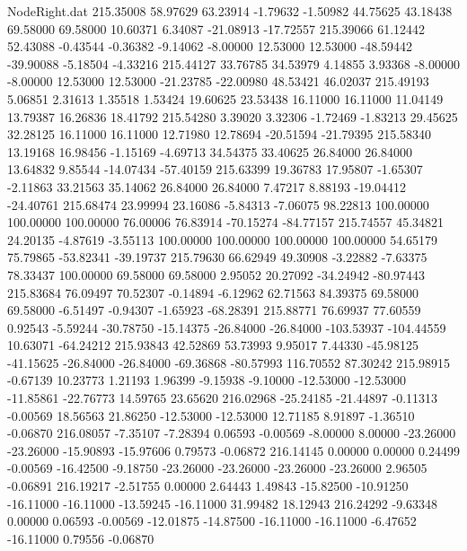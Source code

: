 \begin{filecontents}{NodeRight.dat}
 215.35008   58.97629   63.23914    -1.79632   -1.50982   44.75625   43.18438   69.58000   69.58000   10.60371    6.34087  -21.08913  -17.72557
 215.39066   61.12442   52.43088    -0.43544   -0.36382   -9.14062   -8.00000   12.53000   12.53000  -48.59442  -39.90088   -5.18504   -4.33216
 215.44127   33.76785   34.53979     4.14855    3.93368   -8.00000   -8.00000   12.53000   12.53000  -21.23785  -22.00980   48.53421   46.02037
 215.49193    5.06851    2.31613     1.35518    1.53424   19.60625   23.53438   16.11000   16.11000   11.04149   13.79387   16.26836   18.41792
 215.54280    3.39020    3.32306    -1.72469   -1.83213   29.45625   32.28125   16.11000   16.11000   12.71980   12.78694  -20.51594  -21.79395
 215.58340   13.19168   16.98456    -1.15169   -4.69713   34.54375   33.40625   26.84000   26.84000   13.64832    9.85544  -14.07434  -57.40159
 215.63399   19.36783   17.95807    -1.65307   -2.11863   33.21563   35.14062   26.84000   26.84000    7.47217    8.88193  -19.04412  -24.40761
 215.68474   23.99994   23.16086    -5.84313   -7.06075   98.22813  100.00000  100.00000  100.00000   76.00006   76.83914  -70.15274  -84.77157
 215.74557   45.34821   24.20135    -4.87619   -3.55113  100.00000  100.00000  100.00000  100.00000   54.65179   75.79865  -53.82341  -39.19737
 215.79630   66.62949   49.30908    -3.22882   -7.63375   78.33437  100.00000   69.58000   69.58000    2.95052   20.27092  -34.24942  -80.97443
 215.83684   76.09497   70.52307    -0.14894   -6.12962   62.71563   84.39375   69.58000   69.58000   -6.51497   -0.94307   -1.65923  -68.28391
 215.88771   76.69937   77.60559     0.92543   -5.59244  -30.78750  -15.14375  -26.84000  -26.84000 -103.53937 -104.44559   10.63071  -64.24212
 215.93843   42.52869   53.73993     9.95017    7.44330  -45.98125  -41.15625  -26.84000  -26.84000  -69.36868  -80.57993  116.70552   87.30242
 215.98915   -0.67139   10.23773     1.21193    1.96399   -9.15938   -9.10000  -12.53000  -12.53000  -11.85861  -22.76773   14.59765   23.65620
 216.02968  -25.24185  -21.44897    -0.11313   -0.00569   18.56563   21.86250  -12.53000  -12.53000   12.71185    8.91897   -1.36510   -0.06870
 216.08057   -7.35107   -7.28394     0.06593   -0.00569   -8.00000    8.00000  -23.26000  -23.26000  -15.90893  -15.97606    0.79573   -0.06872
 216.14145    0.00000    0.00000     0.24499   -0.00569  -16.42500   -9.18750  -23.26000  -23.26000  -23.26000  -23.26000    2.96505   -0.06891
 216.19217   -2.51755    0.00000     2.64443    1.49843  -15.82500  -10.91250  -16.11000  -16.11000  -13.59245  -16.11000   31.99482   18.12943
 216.24292   -9.63348    0.00000     0.06593   -0.00569  -12.01875  -14.87500  -16.11000  -16.11000   -6.47652  -16.11000    0.79556   -0.06870

\end{filecontents}
